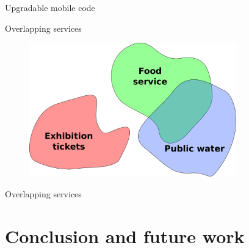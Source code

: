 \documentclass[presentation]{beamer}\mode<presentation>{\usetheme{sapere}}
\begin{document}
\begin{frame}[fragile]{Upgradable mobile code}
\begin{center}
\end{center}
\end{frame}

\begin{frame}{Overlapping services}
  \centering
  \begin{figure}
    \includegraphics[width=0.8\textwidth]{imgs/restaurants2} 
  \end{figure}
\end{frame}

\begin{frame}[fragile]{Overlapping services}
\begin{center}
\end{center}
\end{frame}



\section{Conclusion and future work}
\end{document}
